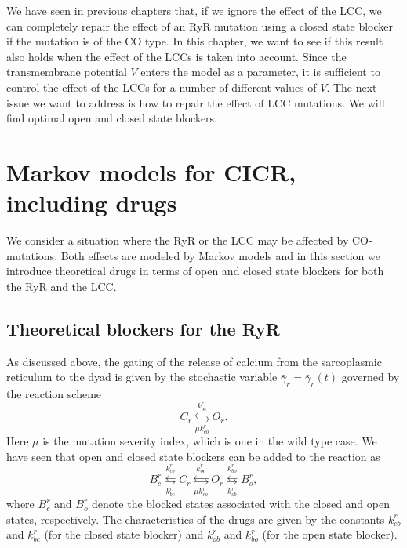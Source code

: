We have seen in previous chapters that, if we ignore the effect of the LCC, we can completely repair the effect of an RyR mutation using a closed state blocker if the mutation is of the CO type. In this chapter, we want to see if this result also holds when the effect of the LCCs is taken into account. Since the transmembrane potential $V$ enters the model as a parameter, it is sufficient to control the effect of the LCCs for a number of different values of $V$.
The next issue we want to address is how to repair the effect of LCC mutations.
We will find optimal open and closed state blockers.

\section{Markov models for CICR, including drugs}

We consider a situation where the RyR or the LCC may be affected by CO-mutations. Both effects are modeled by Markov models and in this section we introduce theoretical drugs in terms of open and closed state blockers for both the RyR and the LCC.

\subsection{Theoretical blockers for the RyR}

As discussed above, the gating of the release of calcium from the sarcoplasmic reticulum to the dyad is
given by the stochastic variable $\bar{\gamma}_{r}=\bar{\gamma}_{r}(t)$
governed by the reaction scheme
\begin{equation}
C_{r}\underset{\mu k_{co}^{r}}{\overset{k_{oc}^{r}}{\leftrightarrows}}
O_{r}.\label{m_r2}
\end{equation}
Here $\mu$ is the mutation severity index, which is one in the wild type case.
We have seen that open and closed state blockers can be added to the reaction as
\begin{equation}
B_{c}^{r}\underset{k_{bc}^{r}}{\overset{k_{cb}^{r}}{\leftrightarrows}}
C_{r}\underset{\mu k_{co}^{r}}{\overset{k_{oc}^{r}}{\leftrightarrows}}
O_{r}\underset{k_{ob}^{r}}{\overset{k_{bo}^{r}}{\leftrightarrows}}B_{o}
^{r},\label{m_r2d}
\end{equation}
where $B_{c}^{r}$ and $B_{o}^{r}$ denote the blocked states associated with the
closed and open states, respectively. The characteristics of the drugs are
given by the constants $k_{cb}^{r}$ and $k_{bc}^{r}$ (for the closed state blocker) and
$k_{ob}^{r}$ and $k_{bo}^{r}$ (for the open state blocker).

